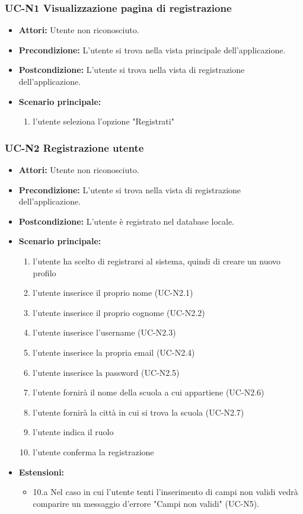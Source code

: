 \subsubsection{UC-N1 Visualizzazione pagina di registrazione}
	\begin{itemize}
		\item \textbf{Attori:} Utente non riconosciuto.
		\item \textbf{Precondizione:} L'utente si trova nella vista principale dell'applicazione.
		\item \textbf{Postcondizione:} L'utente si trova nella vista di registrazione dell'applicazione.
		\item \textbf{Scenario principale:}
		\begin{enumerate}
			\item l'utente seleziona l'opzione "Registrati"
		\end{enumerate}
	\end{itemize}


\subsubsection{UC-N2 Registrazione utente}
\begin{itemize}
		\item \textbf{Attori: }Utente non riconosciuto.
		\item \textbf{Precondizione: }L'utente si trova nella vista di registrazione dell'applicazione.
		\item \textbf{Postcondizione: }L'utente è registrato nel database locale.
		\item \textbf{Scenario principale: }
		\begin{enumerate}
		\item l'utente ha scelto di registrarsi al sistema, quindi di creare un nuovo profilo
		\item l'utente inserisce il proprio nome (UC-N2.1)
		\item l'utente inserisce il proprio cognome (UC-N2.2)
		\item l'utente inserisce l'username (UC-N2.3)
		\item l'utente inserisce la propria email (UC-N2.4)
		\item l'utente inserisce la password (UC-N2.5)
		\item l'utente fornirà il nome della scuola a cui appartiene (UC-N2.6)
		\item l'utente fornirà la città in cui si trova la scuola (UC-N2.7)
		\item l'utente indica il ruolo
		\item l'utente conferma la registrazione
		\end{enumerate}
		\item \textbf{Estensioni: }
		\begin{itemize}
			\item 10.a Nel caso in cui l'utente tenti l'inserimento di campi non validi vedrà comparire un messaggio d'errore "Campi non validi" (UC-N5).
		\end{itemize}
\end{itemize}

